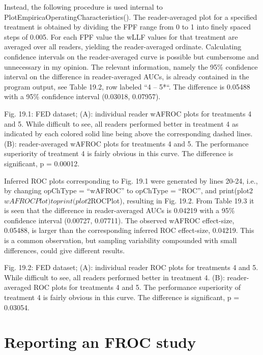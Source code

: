 \documentclass[
]{book}
\begin{document}
Instead, the following procedure is used internal to PlotEmpiricaOperatingCharacteristics(). The reader-averaged plot for a specified treatment is obtained by dividing the FPF range from 0 to 1 into finely spaced steps of 0.005. For each FPF value the wLLF values for that treatment are averaged over all readers, yielding the reader-averaged ordinate. Calculating confidence intervals on the reader-averaged curve is possible but cumbersome and unnecessary in my opinion. The relevant information, namely the 95\% confidence interval on the difference in reader-averaged AUCs, is already contained in the program output, see Table 19.2, row labeled ``4 -- 5*``. The difference is 0.05488 with a 95\% confidence interval (0.03018, 0.07957).

Fig. 19.1: FED dataset; (A): individual reader wAFROC plots for treatments 4 and 5. While difficult to see, all readers performed better in treatment 4 as indicated by each colored solid line being above the corresponding dashed lines. (B): reader-averaged wAFROC plots for treatments 4 and 5. The performance superiority of treatment 4 is fairly obvious in this curve. The difference is significant, p = 0.00012.

Inferred ROC plots corresponding to Fig. 19.1 were generated by lines 20-24, i.e., by changing opChType = ``wAFROC'' to opChType = ``ROC'', and print(plot2\(wAFROCPlot) to print(plot2\)ROCPlot), resulting in Fig. 19.2. From Table 19.3 it is seen that the difference in reader-averaged AUCs is 0.04219 with a 95\% confidence interval (0.00727, 0.07711). The observed wAFROC effect-size, 0.05488, is larger than the corresponding inferred ROC effect-size, 0.04219. This is a common observation, but sampling variability compounded with small differences, could give different results.

Fig. 19.2: FED dataset; (A): individual reader ROC plots for treatments 4 and 5. While difficult to see, all readers performed better in treatment 4. (B): reader-averaged ROC plots for treatments 4 and 5. The performance superiority of treatment 4 is fairly obvious in this curve. The difference is significant, p = 0.03054.

\hypertarget{analyzing-froc-data-reporting}{%
\section{Reporting an FROC study}\label{analyzing-froc-data-reporting}}
\end{document}
